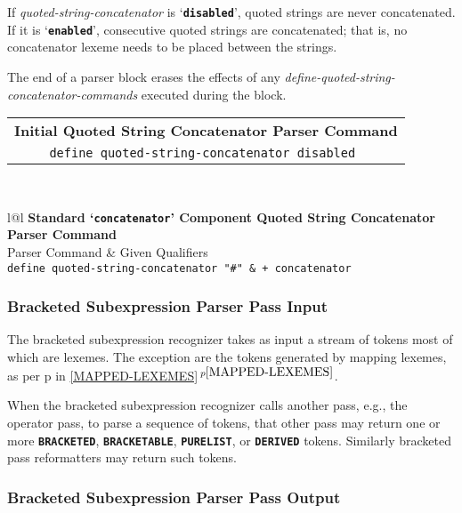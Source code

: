 \documentclass[12pt]{article}
\makeatletter
\newcommand{\TT}[1]{{\tt \bfseries #1}}
\newcommand{\ttkey}[1]{\TT{#1}\index{#1@\TT{#1}}}
\newcommand{\itemref}[1]{\ref{#1}$\,^{p\pageref{#1}}$}
\newcommand{\pagref}[1]{p\pageref{#1}}
\makeatother
\begin{document}
If {\em quoted-string-concatenator} is `\TT{disabled}', quoted strings
are never concatenated.  If it is `\TT{enabled}', consecutive
quoted strings are concatenated; that is, no concatenator lexeme
needs to be placed between the strings.

The end of a parser block erases the effects of any
{\em define-quoted-string-concatenator-commands} executed during the block.

\begin{center}
\begin{tabular}{c}
\bf Initial Quoted String Concatenator Parser Command
\\[1ex]
\tt define quoted-string-concatenator disabled \\
\end{tabular}
\\[2ex]
\begin{tabular}{l@{\hspace*{0.5in}}l}
{\bf Standard `\ttkey{concatenator}'\label{STANDARD-CONCATENATOR-2} Component
     Quoted String Concatenator Parser Command}
\\[1ex]
Parser Command				& Given Qualifiers
\\\hline
\tt define quoted-string-concatenator "\#"	& \tt + concatenator
\end{tabular}
\end{center}

\subsubsection{Bracketed Subexpression Parser Pass Input}
\label{BRACKETED-SUBEXPRESSION-PARSER-PASS-INPUT}

The bracketed subexpression recognizer takes as input a stream
of tokens most of which are lexemes.  The exception are the
tokens generated by mapping lexemes, as per
\pagref{MAPPED-LEXEME-TOKEN-TYPE} in \itemref{MAPPED-LEXEMES}.

When the bracketed subexpression recognizer calls another pass,
e.g., the operator pass, to parse a sequence of tokens, that
other pass may return one or more \TT{BRACKETED},
\TT{BRACKETABLE}, \TT{PURELIST}, or \TT{DERIVED} tokens.
Similarly bracketed pass reformatters may return such tokens.

\subsubsection{Bracketed Subexpression Parser Pass Output}
\label{BRACKETED-SUBEXPRESSION-PARSER-PASS-OUTPUT}
\end{document}
